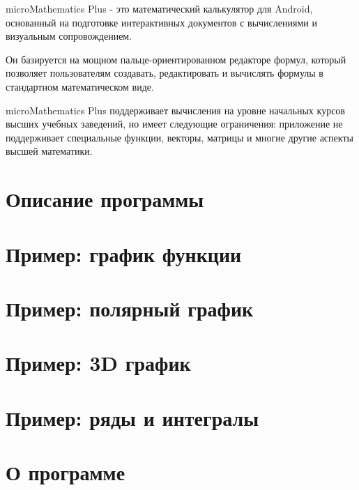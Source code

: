 \documentclass[DIV=calc, paper=a4, fontsize=11pt, twocolumn]{scrartcl}
\begin{document}
\maketitle
\thispagestyle{fancy} %

\begin{bf}
microMathematics Plus - это
математический калькулятор для
Android, основанный на подготовке
интерактивных документов с
вычислениями и визуальным
сопровождением.

Он базируется на мощном
пальце-ориентированном редакторе
формул, который позволяет
пользователям создавать,
редактировать и вычислять формулы
в стандартном математическом виде.

microMathematics Plus поддерживает
вычисления на уровне начальных
курсов высших учебных заведений,
но имеет следующие ограничения:
приложение не поддерживает
специальные функции, векторы,
матрицы и многие другие аспекты
высшей математики.
\end{bf}

\section{Описание программы}


\section{Пример: график функции}


\section{Пример: полярный график}


\section{Пример: 3D график}


\section{Пример: ряды и интегралы}


\section{О программе}
\end{document}

